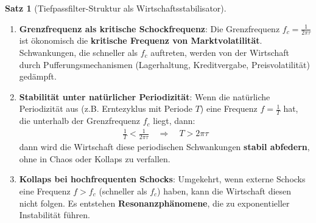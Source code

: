 \documentclass[a4paper, 12pt, twoside, openright]{report}
\theoremstyle{definition}
\theoremstyle{definition}
\newtheorem{satz}{Satz}[chapter]
\begin{document}
\begin{satz}[Tiefpassfilter-Struktur als Wirtschaftsstabilisator]
\begin{enumerate}
\item \textbf{Grenzfrequenz als kritische Schockfrequenz}: Die Grenzfrequenz $f_c = \frac{1}{2\pi \tau}$ ist ökonomisch die \textbf{kritische Frequenz von Marktvolatilität}. Schwankungen, die schneller als $f_c$ auftreten, werden von der Wirtschaft durch Pufferungsmechanismen (Lagerhaltung, Kreditvergabe, Preisvolatilität) gedämpft.

\item \textbf{Stabilität unter natürlicher Periodizität}: Wenn die natürliche Periodizität aus \cite{epp_signal} (z.B. Erntezyklus mit Periode $T$) eine Frequenz $f = \frac{1}{T}$ hat, die unterhalb der Grenzfrequenz $f_c$ liegt, dann:
\begin{align}
\frac{1}{T} < \frac{1}{2\pi \tau} \quad \Rightarrow \quad T > 2\pi \tau
\end{align}
dann wird die Wirtschaft diese periodischen Schwankungen \textbf{stabil abfedern}, ohne in Chaos oder Kollaps zu verfallen.

\item \textbf{Kollaps bei hochfrequenten Schocks}: Umgekehrt, wenn externe Schocks eine Frequenz $f > f_c$ (schneller als $f_c$) haben, kann die Wirtschaft diesen nicht folgen. Es entstehen \textbf{Resonanzphänomene}, die zu exponentieller Instabilität führen.

\end{enumerate}

\end{satz}
\end{document}
